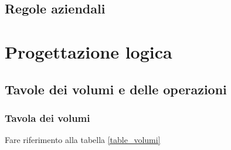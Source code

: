\documentclass{article}
\begin{document}
\subsection{Regole aziendali}

\section{Progettazione logica}

\subsection{Tavole dei volumi e delle operazioni}
\subsubsection{Tavola dei volumi}

Fare riferimento alla tabella \ref{table_volumi}
\end{document}
